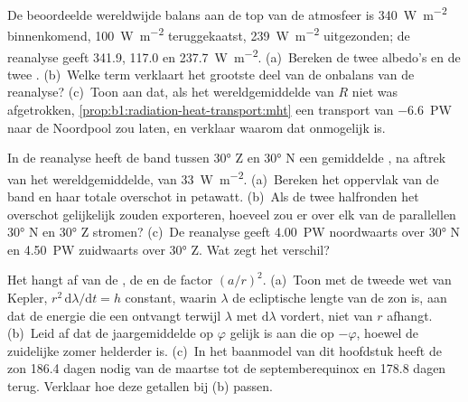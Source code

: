 \begin{exercise}[$\star\star$]\label{exo:b1:radiation-heat-transport:8}
De beoordeelde wereldwijde balans aan de top van de atmosfeer is \qty{340}{W.m^{-2}} binnenkomend, \qty{100}{W.m^{-2}} teruggekaatst, \qty{239}{W.m^{-2}} uitgezonden; de reanalyse geeft \qty{341.9}{}, \qty{117.0}{} en \qty{237.7}{W.m^{-2}}. (a)~Bereken de twee albedo's en de twee . (b)~Welke term verklaart het grootste deel van de onbalans van de reanalyse? (c)~Toon aan dat, als het wereldgemiddelde van $R$ niet was afgetrokken, \cref{prop:b1:radiation-heat-transport:mht} een transport van \qty{-6.6}{PW} naar de Noordpool zou laten, en verklaar waarom dat onmogelijk is.
\end{exercise}

\begin{exercise}[$\star\star$]\label{exo:b1:radiation-heat-transport:9}
In de reanalyse heeft de band tussen \ang{30} Z en \ang{30} N een gemiddelde , na aftrek van het wereldgemiddelde, van \qty{+33}{W.m^{-2}}. (a)~Bereken het oppervlak van de band en haar totale overschot in petawatt. (b)~Als de twee halfronden het overschot gelijkelijk zouden exporteren, hoeveel zou er over elk van de parallellen \ang{30} N en \ang{30} Z stromen? (c)~De reanalyse geeft \qty{4.00}{PW} noordwaarts over \ang{30} N en \qty{4.50}{PW} zuidwaarts over \ang{30} Z. Wat zegt het verschil?
\end{exercise}

\begin{exercise}[$\star\star\star$]\label{exo:b1:radiation-heat-transport:10}
Het  hangt af van de , de  en de factor $(a/r)^2$. (a)~Toon met de tweede wet van Kepler, $r^2\,\mathrm d\lambda/\mathrm dt = h$
constant, waarin $\lambda$ de ecliptische lengte van de zon is, aan dat de energie die een  ontvangt terwijl $\lambda$ met $\mathrm d\lambda$ vordert, niet van $r$ afhangt. (b)~Leid af dat de jaargemiddelde  op  $\varphi$ gelijk is aan die op $-\varphi$, hoewel de zuidelijke zomer helderder is. (c)~In het baanmodel van dit hoofdstuk heeft de zon \num{186.4} dagen nodig van de maartse tot de septemberequinox en \num{178.8} dagen terug. Verklaar hoe deze getallen bij (b) passen.
\end{exercise}

